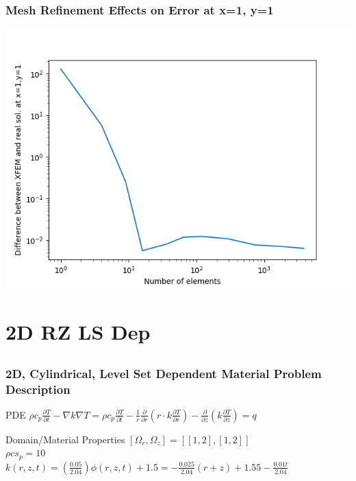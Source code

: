\documentclass[]{beamer}
\begin{document}
\begin{frame}[t]\frametitle{Mesh Refinement Effects on Error at x=1, y=1}
	\begin{center}
		\includegraphics[scale=0.4]{figures/2D_rz_h1m/2D_rz_homog1mat_neumann_comp}
	\end{center}
\end{frame}

\section{2D RZ LS Dep}
\subsection{}
\begin{frame}[t]\frametitle{2D, Cylindrical, Level Set Dependent Material Problem Description}
  \begin{block}{PDE}
    $\rho c_p\frac{\partial T}{\partial t} - \nabla k \nabla T = 
    \rho c_p\frac{\partial T}{\partial t} - \frac{1}{r}\frac{\partial}{\partial r}
    \left(r\cdot k\frac{\partial T}{\partial r}\right) - \frac{\partial}{\partial z}
    \left(k\frac{\partial T}{\partial z}\right)= q$
  \end{block}
  
  \begin{block}{Domain/Material Properties}
  	$[\Omega_r,\Omega_z] = [[1,2],[1,2]]$ \\
  	$\rho cs_p = 10$ \\
  	$k(r,z,t) = \left(\frac{0.05}{2.04}\right) \phi(r,z,t) + 1.5 = 
  	-\frac{0.025}{2.04}(r+z) + 1.55 - \frac{0.01t}{2.04}$
  \end{block}
\end{frame}
\end{document}
